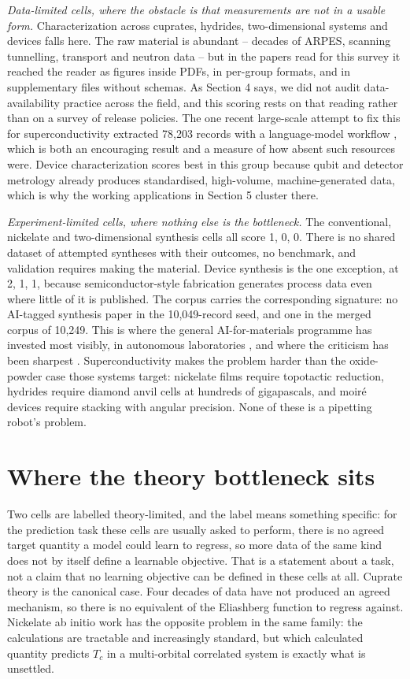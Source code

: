 \documentclass[
  11pt,
]{article}
\begin{document}
\emph{Data-limited cells, where the obstacle is that measurements are
not in a usable form.} Characterization across cuprates, hydrides,
two-dimensional systems and devices falls here. The raw material is
abundant -- decades of ARPES, scanning tunnelling, transport and neutron
data -- but in the papers read for this survey it reached the reader as
figures inside PDFs, in per-group formats, and in supplementary files
without schemas. As Section 4 says, we did not audit data-availability
practice across the field, and this scoring rests on that reading rather
than on a survey of release policies. The one recent large-scale attempt
to fix this for superconductivity extracted 78,203 records with a
language-model workflow \citep{itani2025large}, which is both an
encouraging result and a measure of how absent such resources were.
Device characterization scores best in this group because qubit and
detector metrology already produces standardised, high-volume,
machine-generated data, which is why the working applications in Section
5 cluster there.

\emph{Experiment-limited cells, where nothing else is the bottleneck.}
The conventional, nickelate and two-dimensional synthesis cells all
score 1, 0, 0. There is no shared dataset of attempted syntheses with
their outcomes, no benchmark, and validation requires making the
material. Device synthesis is the one exception, at 2, 1, 1, because
semiconductor-style fabrication generates process data even where little
of it is published. The corpus carries the corresponding signature: no
AI-tagged synthesis paper in the 10,049-record seed, and one in the
merged corpus of 10,249. This is where the general AI-for-materials
programme has invested most visibly, in autonomous laboratories
\citep{szymanski2023autonomous}, and where the criticism has been
sharpest \citep{leeman2024challenges}. Superconductivity makes the
problem harder than the oxide-powder case those systems target:
nickelate films require topotactic reduction, hydrides require diamond
anvil cells at hundreds of gigapascals, and moiré devices require
stacking with angular precision. None of these is a pipetting robot's
problem.

\section{Where the theory bottleneck
sits}\label{where-the-theory-bottleneck-sits}

Two cells are labelled theory-limited, and the label means something
specific: for the prediction task these cells are usually asked to
perform, there is no agreed target quantity a model could learn to
regress, so more data of the same kind does not by itself define a
learnable objective. That is a statement about a task, not a claim that
no learning objective can be defined in these cells at all. Cuprate
theory is the canonical case. Four decades of data have not produced an
agreed mechanism, so there is no equivalent of the Eliashberg function
to regress against. Nickelate ab initio work has the opposite problem in
the same family: the calculations are tractable and increasingly
standard, but which calculated quantity predicts \(T_c\) in a
multi-orbital correlated system is exactly what is unsettled.
\end{document}
